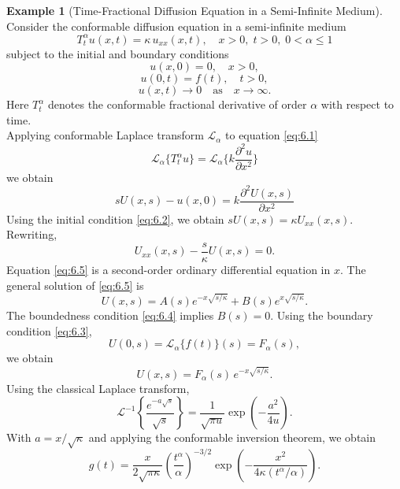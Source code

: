 \documentclass[two side,reqno,12pt]{amsart}
\numberwithin{equation}{section}
\theoremstyle{definition}
\newtheorem{example}[lemma]{Example}
\begin{document}
\begin{example}[Time-Fractional Diffusion Equation in a Semi-Infinite Medium] Consider the conformable diffusion equation in a semi-infinite medium
\begin{equation}
 T_t^\alpha u(x,t) = \kappa \, u_{xx}(x,t), \quad x > 0, \; t > 0, \; 0 < \alpha \leq 1  
 \label{eq:6.1}
\end{equation}
subject to the initial and boundary conditions
\begin{equation}
   u(x,0) = 0, \quad x > 0,  
   \label{eq:6.2}
\end{equation}
\begin{equation}
    u(0,t) = f(t), \quad t > 0,
    \label{eq:6.3}
\end{equation}
\begin{equation}
   u(x,t) \to 0 \quad \text{as} \quad x \to \infty.  
   \label{eq:6.4}
\end{equation}
Here \( T_t^\alpha \) denotes the conformable fractional derivative of order \( \alpha \) with respect to time.\\
Applying conformable Laplace transform $\mathcal{L}_{\alpha}$ to equation \eqref{eq:6.1}
\[
  \mathcal{L}_{\alpha}\{T_t^\alpha u\} = \mathcal{L}_{\alpha}\{k\frac{\partial^2 u}{\partial x^2}\}  
\]
we obtain
\[
    sU(x,s) - u(x,0)=k\frac{\partial^2 U(x,s)}{\partial x^2}
\]
Using the initial condition \eqref{eq:6.2}, we obtain 
$sU(x,s) = \kappa U_{xx}(x,s).$
Rewriting,
\begin{equation}
  U_{xx}(x,s) - \frac{s}{\kappa} U(x,s) = 0. 
  \label{eq:6.5}
\end{equation}
Equation \eqref{eq:6.5} is a second-order ordinary differential equation in 
$x.$
The general solution of \eqref{eq:6.5}  is
\[
    U(x,s) = A(s) e^{-x\sqrt{s/\kappa}} + B(s) e^{x\sqrt{s/\kappa}}. 
\]
The boundedness condition \eqref{eq:6.4} implies \( B(s) = 0 \).
Using the boundary condition \eqref{eq:6.3},
\[
    U(0,s) = \mathcal{L}_{\alpha}\{f(t)\}(s) = F_{\alpha}(s),
\]
we obtain
\[
    U(x,s) = F_{\alpha}(s) \, e^{-x\sqrt{s/\kappa}}. 
\]
Using the classical Laplace transform,
\[
    \mathcal{L}^{-1}\!\left\{ \frac{e^{-a\sqrt{s}}}{\sqrt{s}} \right\}
= \frac{1}{\sqrt{\pi u}} \exp\!\left( -\frac{a^2}{4u} \right). 
\]
With \( a = x/\sqrt{\kappa} \) and applying the conformable inversion theorem, we obtain
\begin{equation}
    g(t) = \frac{x}{2\sqrt{\pi \kappa}} \left( \frac{t^{\alpha}}{\alpha} \right)^{-3/2}
\exp\!\left( -\frac{x^2}{4\kappa (t^{\alpha}/\alpha)} \right).
\label{eq:6.6}

\end{equation}
\end{example}
\end{document}
